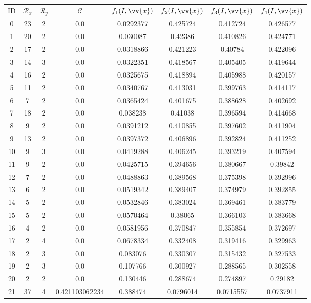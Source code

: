 \scriptsize
\begin{longtable}{|c|c|c|c|c|c|c|c|}
\hline
ID & $\mathscr{R}_x$ & $\mathscr{R}_y$ & $\mathscr{C}$ & $f_1(I,\vv{x})$ & $f_2(I,\vv{x})$ & $f_3(I,\vv{x})$ & $f_4(I,\vv{x})$ \\
0 & 23 & 2 & 0.0 & 0.0292377 & 0.425724 & 0.412724 & 0.426577 \\
1 & 20 & 2 & 0.0 & 0.030087 & 0.42386 & 0.410826 & 0.424771 \\
2 & 17 & 2 & 0.0 & 0.0318866 & 0.421223 & 0.40784 & 0.422096 \\
3 & 14 & 3 & 0.0 & 0.0322351 & 0.418567 & 0.405405 & 0.419644 \\
4 & 16 & 2 & 0.0 & 0.0325675 & 0.418894 & 0.405988 & 0.420157 \\
5 & 11 & 2 & 0.0 & 0.0340767 & 0.413031 & 0.399763 & 0.414117 \\
6 & 7 & 2 & 0.0 & 0.0365424 & 0.401675 & 0.388628 & 0.402692 \\
7 & 18 & 2 & 0.0 & 0.038238 & 0.41038 & 0.396594 & 0.414668 \\
8 & 9 & 2 & 0.0 & 0.0391212 & 0.410855 & 0.397602 & 0.411904 \\
9 & 13 & 2 & 0.0 & 0.0397372 & 0.406896 & 0.392824 & 0.411252 \\
10 & 9 & 3 & 0.0 & 0.0419288 & 0.406245 & 0.393219 & 0.407594 \\
11 & 9 & 2 & 0.0 & 0.0425715 & 0.394656 & 0.380667 & 0.39842 \\
12 & 7 & 2 & 0.0 & 0.0488863 & 0.389568 & 0.375398 & 0.392996 \\
13 & 6 & 2 & 0.0 & 0.0519342 & 0.389407 & 0.374979 & 0.392855 \\
14 & 5 & 2 & 0.0 & 0.0532846 & 0.383024 & 0.369461 & 0.383779 \\
15 & 5 & 2 & 0.0 & 0.0570464 & 0.38065 & 0.366103 & 0.383668 \\
16 & 4 & 2 & 0.0 & 0.0581956 & 0.370847 & 0.355854 & 0.372697 \\
17 & 2 & 4 & 0.0 & 0.0678334 & 0.332408 & 0.319416 & 0.329963 \\
18 & 2 & 3 & 0.0 & 0.083076 & 0.330307 & 0.315432 & 0.327533 \\
19 & 2 & 3 & 0.0 & 0.107766 & 0.300927 & 0.288565 & 0.302558 \\
20 & 2 & 2 & 0.0 & 0.130446 & 0.288674 & 0.274897 & 0.29182 \\
21 & 37 & 4 & 0.421103062234 & 0.388474 & 0.0796014 & 0.0715557 & 0.0737911 \\

\end{longtable}
